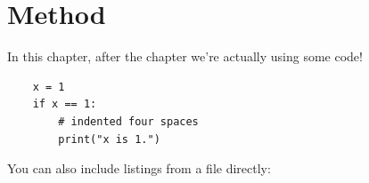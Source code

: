 \chapter{Method}
\label{ch:method}

In this chapter, after the  chapter we're actually using some code!

\begin{listing}[htbp]
	\caption{This is an example of inline listing}
	\label{lst:code0}
	\begin{verbatim}
    x = 1
    if x == 1:
        # indented four spaces
        print("x is 1.")
    \end{verbatim}
\end{listing}

You can also include listings from a file directly:

\begin{listing}[htbp]
	\caption{This is an example of included listing}
	\label{lst:code1}
	\inputminted{python}{code/example.py}
\end{listing}
